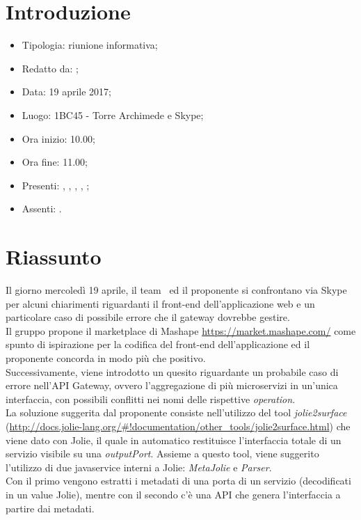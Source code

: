 \section{Introduzione}

	\begin{itemize}
		\item Tipologia: riunione informativa;
		\item Redatto da: \MC;
		\item Data: 19 aprile 2017;
		\item Luogo: 1BC45 - Torre Archimede e Skype;
		\item Ora inizio: 10.00;
		\item Ora fine: 11.00;
		\item Presenti: \MC, \DAN, \DS, \NS, \AS;	
		\item Assenti: \AN.
	\end{itemize}

\section{Riassunto}
Il giorno mercoledì 19 aprile, il team \gruppo\ ed il proponente si confrontano via Skype per alcuni chiarimenti riguardanti il front-end dell'applicazione web e un particolare caso di possibile errore che il gateway dovrebbe gestire.\\
Il gruppo propone il marketplace di Mashape \url{https://market.mashape.com/} come spunto di ispirazione per la codifica del front-end dell'applicazione ed il proponente concorda in modo più che positivo.\\
Successivamente, viene introdotto un quesito riguardante un probabile caso di errore nell'API Gateway, ovvero l'aggregazione di più microservizi in un'unica interfaccia, con possibili conflitti nei nomi delle rispettive \textit{operation}.\\
La soluzione suggerita dal proponente consiste nell'utilizzo del tool \textit{jolie2surface} (\url{http://docs.jolie-lang.org/#!documentation/other_tools/jolie2surface.html}) che viene dato con Jolie, il quale in automatico restituisce l'interfaccia totale di un servizio visibile su una \textit{outputPort}.
Assieme a questo tool, viene suggerito l'utilizzo di due javaservice interni a Jolie: \textit{MetaJolie} e \textit{Parser}.\\
Con il primo vengono estratti i metadati di una porta di un servizio (decodificati in un value Jolie), mentre con il secondo c'è una API che genera l'interfaccia a partire dai metadati.


